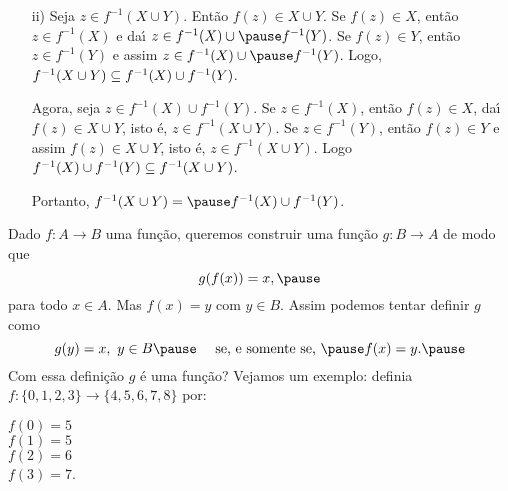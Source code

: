 \documentclass{beamer}
\begin{document}
        \begin{frame}
            \begin{enumerate}
                \item[ii)] Seja $z \in f^{-1}(X \cup Y)$. \pause Ent{\~a}o $f(z) \in X \cup Y$. \pause Se $f(z) \in X$, \pause ent\~ao $z \in f^{-1}(X)$ \pause e da{\'\i} $z \in f^{-1}(X) \cup \pause f^{-1}(Y)$. \pause Se $f(z) \in Y$, \pause ent{\~a}o $z \in f^{-1}(Y)$ \pause e assim $z \in f^{-1}(X) \cup \pause f^{-1}(Y)$. \pause Logo, $f^{-1}(X \cup Y) \subseteq f^{-1}(X) \cup f^{-1}(Y)$.\pause

                \vspace{.3cm}

                Agora, seja $z \in f^{-1}(X) \cup f^{-1}(Y)$. \pause Se $z \in f^{-1}(X)$, \pause ent{\~a}o $f(z) \in X$, \pause da{\'\i} $f(z) \in X \cup Y$, \pause isto {\'e}, \pause $z \in f^{-1}(X \cup Y)$. \pause Se $z \in f^{-1}(Y)$, \pause ent{\~a}o $f(z) \in Y$ \pause e assim $f(z) \in X \cup Y$, \pause isto {\'e}, \pause $z \in f^{-1}(X \cup Y)$. \pause Logo $f^{-1}(X) \cup f^{-1}(Y) \subseteq f^{-1}(X \cup Y)$.\pause

                \vspace{.3cm}

                Portanto, \pause $f^{-1}(X \cup Y) = \pause f^{-1}(X) \cup f^{-1}(Y)$.\pause \hspace{.5cm} \qedsymbol
            \end{enumerate}
    \end{frame}

    \begin{frame}
        Dado $f : A \to B$ \pause uma fun\c{c}{\~a}o, \pause queremos construir uma fun\c{c}\~ao $g : B \to A$ \pause de modo que
        \[
            g(f(x)) = x,\pause
        \]
        para todo $x \in A$. \pause Mas $f(x) = y$ \pause com $y \in B$. \pause Assim podemos tentar definir $g$ \pause como
        \[
            g(y) = x,\ y \in B \pause \quad \mbox{ se, e somente se, } \pause f(x) = y.\pause
        \]
        Com essa defini\c{c}\~ao \pause $g$ \'e uma fun\c{c}\~ao? \pause Vejamos um exemplo: \pause definia $f : \{0,1,2,3\} \to \{4,5,6,7,8\}$ por:\pause
        \begin{center}
            $f(0) = 5$ \pause\\
            \vspace{.3cm}
            $f(1) = 5$\pause\\
            \vspace{.3cm}
            $f(2) = 6$\pause\\
            \vspace{.3cm}
            $f(3) = 7$.\pause
        \end{center}
    \end{frame}
\end{document}
